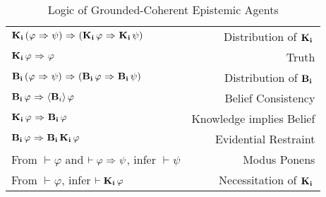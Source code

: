 \begin{table}[H]
\begin{center}
	\begin{tabular}{| l r |}
		\hline
		$\mathbf{K}_{\mathbf{i}}\,(\varphi {\ \Rightarrow \ } \psi) {\ \Rightarrow \ } (\mathbf{K}_{\mathbf{i}}\,\varphi {\ \Rightarrow \ } \mathbf{K}_{\mathbf{i}}\,\psi)$ & Distribution of $\mathbf{K}_{\mathbf{i}}\,$ \\
		$\mathbf{K}_{\mathbf{i}}\,\varphi {\ \Rightarrow \ } \varphi$ & Truth \\
		$\mathbf{B}_{\mathbf{i}}\,(\varphi {\ \Rightarrow \ } \psi) {\ \Rightarrow \ } (\mathbf{B}_{\mathbf{i}}\,\varphi {\ \Rightarrow \ } \mathbf{B}_{\mathbf{i}}\,\psi)$ & Distribution of $\mathbf{B}_{\mathbf{i}}\,$\\
		$\mathbf{B}_{\mathbf{i}}\,\varphi {\ \Rightarrow \ } \langle \mathbf{B}_{i} \rangle\,\varphi$ & Belief Consistency \\
		$\mathbf{K}_{\mathbf{i}}\,\varphi {\ \Rightarrow \ } \mathbf{B}_{\mathbf{i}}\,\varphi$ & Knowledge implies Belief \\
		$\mathbf{B}_{\mathbf{i}}\,\varphi {\ \Rightarrow \ } \mathbf{B}_{\mathbf{i}}\,\mathbf{K}_{\mathbf{i}}\,\varphi$ & Evidential Restraint\\
		From $\vdash \varphi$ and $\vdash \varphi {\ \Rightarrow \ } \psi$, infer $\vdash\psi$ & Modus Ponens\\
		From $\vdash \varphi$, infer $\vdash \mathbf{K}_{\mathbf{i}}\,\varphi$ & Necessitation of $\mathbf{K}_{\mathbf{i}}\,$\\
		\hline
	\end{tabular}
	\caption{Logic of Grounded-Coherent Epistemic Agents}~\label{GC_agent}
\end{center}
\end{table}


